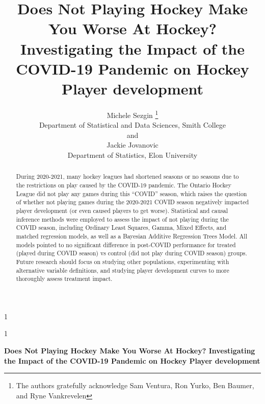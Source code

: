\documentclass[12pt]{article}
\newcommand{\blind}{1}
\begin{document}
\def\spacingset#1{\renewcommand{\baselinestretch}%
{#1}\small\normalsize} \spacingset{1}



\blind
{
  \title{\bf Does Not Playing Hockey Make You Worse At Hockey?
Investigating the Impact of the COVID-19 Pandemic on Hockey Player
development}

  \author{
        Michele Sezgin \thanks{The authors gratefully acknowledge Sam
Ventura, Ron Yurko, Ben Baumer, and Ryne Vankrevelen} \\
    Department of Statistical and Data Sciences, Smith College\\
     and \\     Jackie Jovanovic \\
    Department of Statistics, Elon University\\
      }
  \maketitle
} \fi

\blind
{
  \bigskip
  \bigskip
  \bigskip
  \begin{center}
    {\LARGE\bf Does Not Playing Hockey Make You Worse At Hockey?
Investigating the Impact of the COVID-19 Pandemic on Hockey Player
development}
  \end{center}
  \medskip
} \fi

\bigskip
\begin{abstract}
During 2020-2021, many hockey leagues had shortened seasons or no
seasons due to the restrictions on play caused by the COVID-19 pandemic.
The Ontario Hockey League did not play any games during this ``COVID''
season, which raises the question of whether not playing games during
the 2020-2021 COVID season negatively impacted player development (or
even caused players to get worse). Statistical and causal inference
methods were employed to assess the impact of not playing during the
COVID season, including Ordinary Least Squares, Gamma, Mixed Effects,
and matched regression models, as well as a Bayesian Additive Regression
Trees Model. All models pointed to no significant difference in
post-COVID performance for treated (played during COVID season) vs
control (did not play during COVID season) groups. Future research
should focus on studying other populations, experimenting with
alternative variable definitions, and studying player development curves
to more thoroughly assess treatment impact.
\end{abstract}
\end{document}
